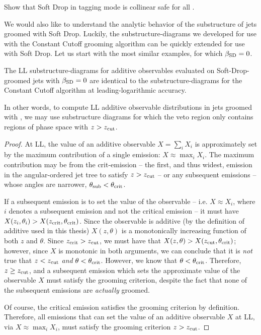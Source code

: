 \begin{exercise}{}{}
    Show that Soft Drop in tagging mode is collinear safe for all \betasd{}.
\end{exercise}



We would also like to understand the analytic behavior of the substructure of jets groomed with Soft Drop.
%
Luckily, the \glspl{substructure-diagram} we developed for use with the Constant Cutoff grooming algorithm can be quickly extended for use with Soft Drop.
%
Let us start with the most similar examples, for which \(\beta_\text{SD}=0\).

\begin{lemma}{}{}
    The LL \glspl{substructure-diagram} for additive observables evaluated on Soft-Drop-groomed jets with \(\beta_\text{SD}=0\) are identical to the \glspl{substructure-diagram} for the Constant Cutoff algorithm at leading-logarithmic accuracy.

    In other words, to compute LL additive observable distributions in jets groomed with , we may use substructure diagrams for which the veto region only contains regions of phase space with \(z > z_{\rm cut}\).
\end{lemma}

\begin{proof}
    At LL, the value of an additive observable \(X = \sum_i X_i\) is approximately set by the maximum contribution of a single emission:
    \(X \approx \max_i X_i\).
    The maximum contribution may be from the \gls{crit-emission} -- the first, and thus widest, emission in the angular-ordered jet tree to satisfy \(z > z_{\rm cut}\) -- or any subsequent emissions -- whose angles are narrower, \(\theta_\text{sub} < \theta_{\rm crit}\).

    If a subsequent emission is to set the value of the observable -- i.e. \(X \approx X_i\), where \(i\) denotes a subsequent emission and not the critical emission -- it must have \(X(z_i, \theta_i) > X(z_{\rm crit}, \theta_{\rm crit})\).
    Since the observable is additive (by the definition of additive used in this thesis) \(X(z,\theta)\) is a monotonically increasing function of both \(z\) and \(\theta\).
    Since \(z_{\rm crit} > z_{\rm cut}\), we must have that \(X(z, \theta) > X(z_{\rm cut}, \theta_{\rm crit})\);
    however, since \(X\) is monotonic in both arguments, we can conclude that it is \textit{not} true that \(z < z_{\rm cut}\) \textit{and} \(\theta < \theta_{\rm crit}\).
    However, we know that \(\theta < \theta_{\rm crit}\).
    Therefore, \(z \geq z_{\rm cut}\), and a subsequent emission which sets the approximate value of the observable \(X\) must satisfy the grooming criterion, despite the fact that none of the subsequent emissions are \textit{actually} groomed.

    Of course, the critical emission satisfies the grooming criterion by definition.
    Therefore, all emissions that can set the value of an additive observable \(X\) at LL, via \(X \approx \max_i X_i\), must satisfy the grooming criterion \(z > z_{\rm cut}\).
\end{proof}

